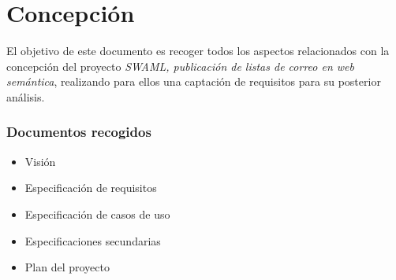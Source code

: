
\section{Concepción}

El objetivo de este documento es recoger todos los aspectos relacionados
con la concepción del proyecto 
\emph{SWAML, publicación de listas de correo en web semántica}, realizando
para ellos una captación de requisitos para su posterior análisis.

\subsubsection{Documentos recogidos}

\begin{itemize}
 \item Visión
 \item Especificación de requisitos
 \item Especificación de casos de uso
 \item Especificaciones secundarias
 \item Plan del proyecto
\end{itemize}

\newpage



\newpage



\newpage



\newpage



\newpage



